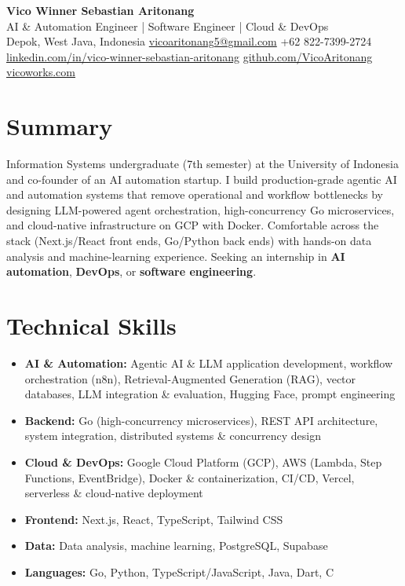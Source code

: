 \documentclass[a4paper,11pt]{article}
\begin{document}
{\Huge\bfseries Vico Winner Sebastian Aritonang}\\[6pt]
{\large AI \& Automation Engineer \;|\; Software Engineer \;|\; Cloud \& DevOps}\\[8pt]
\small
Depok, West Java, Indonesia \;\textbar\;
\href{mailto:vicoaritonang5@gmail.com}{vicoaritonang5@gmail.com} \;\textbar\;
+62 822-7399-2724\\[3pt]
\href{https://www.linkedin.com/in/vico-winner-sebastian-aritonang-93a609249/}{linkedin.com/in/vico-winner-sebastian-aritonang} \;\textbar\;
\href{https://github.com/VicoAritonang}{github.com/VicoAritonang} \;\textbar\;
\href{https://vicoworks.com}{vicoworks.com}
\normalsize

\section{Summary}
Information Systems undergraduate (7th semester) at the University of Indonesia and co-founder of an AI automation
startup. I build production-grade agentic AI and automation systems that remove operational and workflow
bottlenecks by designing LLM-powered agent orchestration, high-concurrency Go microservices, and cloud-native
infrastructure on GCP with Docker. Comfortable across the stack (Next.js/React front ends, Go/Python back ends) with
hands-on data analysis and machine-learning experience. Seeking an internship in \textbf{AI automation}, \textbf{DevOps},
or \textbf{software engineering}.

\section{Technical Skills}
\begin{itemize}
  \item \textbf{AI \& Automation:} Agentic AI \& LLM application development, workflow orchestration (n8n), Retrieval-Augmented Generation (RAG), vector databases, LLM integration \& evaluation, Hugging Face, prompt engineering
  \item \textbf{Backend:} Go (high-concurrency microservices), REST API architecture, system integration, distributed systems \& concurrency design
  \item \textbf{Cloud \& DevOps:} Google Cloud Platform (GCP), AWS (Lambda, Step Functions, EventBridge), Docker \& containerization, CI/CD, Vercel, serverless \& cloud-native deployment
  \item \textbf{Frontend:} Next.js, React, TypeScript, Tailwind CSS
  \item \textbf{Data:} Data analysis, machine learning, PostgreSQL, Supabase
  \item \textbf{Languages:} Go, Python, TypeScript/JavaScript, Java, Dart, C
\end{itemize}
\end{document}
